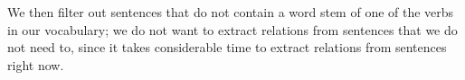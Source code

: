 We then filter out sentences that do not contain a word stem of one of the verbs in our vocabulary;
we do not want to extract relations from sentences that we do not need to, since it takes considerable time
to extract relations from sentences right now.
